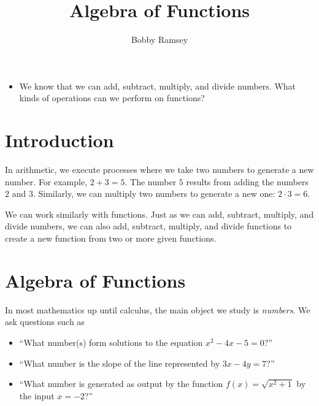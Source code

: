 \documentclass{ximera}
\author{Bobby Ramsey}
\title{Algebra of Functions}
\begin{document}
\begin{abstract}
  
\end{abstract}
\licenseAPC
\maketitle


\begin{motivatingQuestions} 
	\begin{itemize}
		\item We know that we can add, subtract, multiply, and divide numbers. What kinds of operations can we perform on functions?
	\end{itemize} 
\end{motivatingQuestions}



\section{Introduction}

	In arithmetic, we execute processes where we take two numbers to generate a new number. For example, 
	$2 + 3 = 5$. The number $5$ results from adding the numbers $2$ and $3$.
	Similarly, we can multiply two numbers to generate a new one: $2 \cdot 3 = 6$.
	
	We can work similarly with functions. Just as we can add, subtract, multiply, and divide numbers, we can also add, subtract, multiply, and divide 
	functions to create a new function from two or more given functions.

\section{Algebra of Functions}

	In most mathematics up until calculus, the main object we study is \emph{numbers}. We ask questions such as
	\begin{itemize}
		\item ``What number(s) form solutions to the equation $x^2 - 4x - 5 = 0$?''\\
		\item ``What number is the slope of the line represented by $3x - 4y = 7$?''\\
		\item ``What number is generated as output by the function $f(x) = \sqrt{x^2 + 1}$ by the input $x = -2$?''
	\end{itemize}
	
\end{document}
